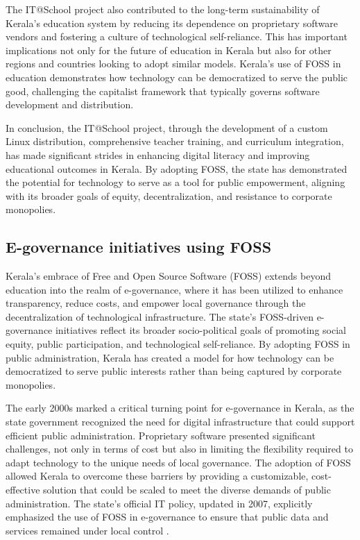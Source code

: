 \begin{refsection}
The IT@School project also contributed to the long-term sustainability of Kerala’s education system by reducing its dependence on proprietary software vendors and fostering a culture of technological self-reliance. This has important implications not only for the future of education in Kerala but also for other regions and countries looking to adopt similar models. Kerala's use of FOSS in education demonstrates how technology can be democratized to serve the public good, challenging the capitalist framework that typically governs software development and distribution.

In conclusion, the IT@School project, through the development of a custom Linux distribution, comprehensive teacher training, and curriculum integration, has made significant strides in enhancing digital literacy and improving educational outcomes in Kerala. By adopting FOSS, the state has demonstrated the potential for technology to serve as a tool for public empowerment, aligning with its broader goals of equity, decentralization, and resistance to corporate monopolies.

\subsection{E-governance initiatives using FOSS}

Kerala’s embrace of Free and Open Source Software (FOSS) extends beyond education into the realm of e-governance, where it has been utilized to enhance transparency, reduce costs, and empower local governance through the decentralization of technological infrastructure. The state’s FOSS-driven e-governance initiatives reflect its broader socio-political goals of promoting social equity, public participation, and technological self-reliance. By adopting FOSS in public administration, Kerala has created a model for how technology can be democratized to serve public interests rather than being captured by corporate monopolies.

The early 2000s marked a critical turning point for e-governance in Kerala, as the state government recognized the need for digital infrastructure that could support efficient public administration. Proprietary software presented significant challenges, not only in terms of cost but also in limiting the flexibility required to adapt technology to the unique needs of local governance. The adoption of FOSS allowed Kerala to overcome these barriers by providing a customizable, cost-effective solution that could be scaled to meet the diverse demands of public administration. The state's official IT policy, updated in 2007, explicitly emphasized the use of FOSS in e-governance to ensure that public data and services remained under local control \cite[pp.~22-23]{kerala2007itpolicy}.


\end{refsection}
